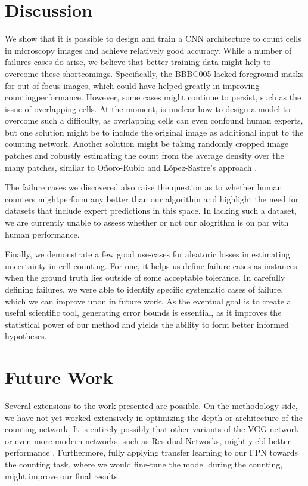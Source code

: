 \documentclass[10pt,twocolumn,letterpaper]{article}
\begin{document}
\section{Discussion}
We show that it is possible to design and train a CNN architecture to count cells in microscopy images
and achieve relatively good accuracy. While a number of failures cases do arise, we believe that
better training data might help to overcome these shortcomings. Specifically, the BBBC005 lacked foreground masks
for out-of-focus images, which could have helped greatly in improving countingperformance. However, some cases might
continue to persist, such as the issue of overlapping cells. At the moment, is unclear how to design a model to overcome
such a difficulty, as overlapping cells can even confound human experts, but one solution might be
to include the original image as additional input to the counting network. Another solution might be taking randomly
cropped image patches and robustly estimating the count from the average density over the many patches,
similar to O\~{n}oro-Rubio and L\'{o}pez-Sastre's approach \cite{hydra}.


The failure cases we discovered also raise the question as to whether human counters mightperform any better than our
algorithm and highlight the need for datasets that include expert predictions in this space. In lacking such a dataset,
we are currently unable to assess whether or not our alogrithm is on par with human performance.


Finally, we demonstrate a few good use-cases for aleatoric losses in estimating uncertainty
in cell counting. For one, it helps us define failure cases as instances when the ground truth lies outside of some acceptable tolerance.
In carefully defining failures, we were able to identify specific systematic cases of failure, which we can improve upon in future work.
As the eventual goal is to create a useful scientific tool, generating error bounds is
essential, as it improves the statistical power of our method and yields the ability to form
better informed hypotheses.




\section{Future Work}
Several extensions to the work presented are possible. On the methodology side, we have not yet worked extensively in optimizing the depth or architecture of the counting network.
It is entirely possibly that other variants of the VGG network or even more modern networks, such as Residual Networks, might yield better performance \cite{resnet}.
Furthermore, fully applying transfer learning to our FPN towards the counting task, where we would fine-tune the model during the
counting, might improve our final results.
\end{document}
